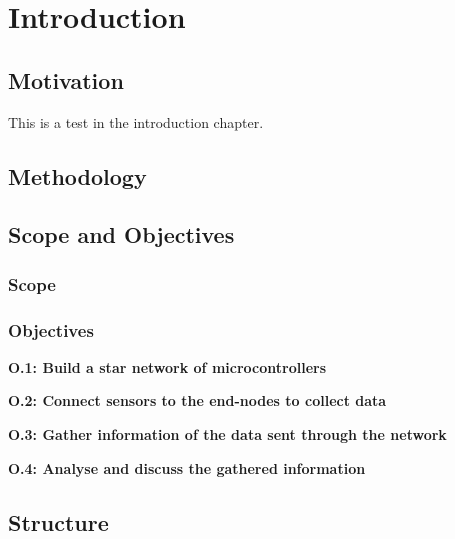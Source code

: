 \chapter{Introduction}
\label{chp:introduction} 


\section{Motivation}

This is a test in the introduction chapter. 

\section{Methodology}

\section{Scope and Objectives}

\subsection{Scope}

\subsection{Objectives}

\noindent \textbf{O.1: Build a star network of microcontrollers}

\noindent\textbf{O.2: Connect sensors to the end-nodes to collect data}

\noindent\textbf{O.3: Gather information of the data sent through the network}

\noindent\textbf{O.4: Analyse and discuss the gathered information}

\section{Structure}